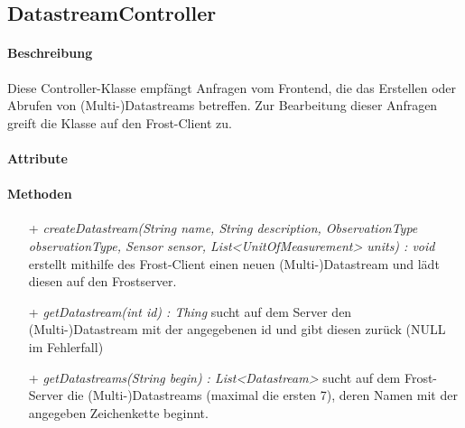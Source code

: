 \subsection{DatastreamController}

\paragraph{Beschreibung}
Diese Controller-Klasse empfängt Anfragen vom Frontend, die das Erstellen oder Abrufen von (Multi-)Datastreams betreffen. Zur Bearbeitung dieser Anfragen greift die Klasse auf den Frost-Client zu.


\paragraph{Attribute}

\paragraph{Methoden}
\begin{itemize}
\item[+] \textit{createDatastream(String name, String description, ObservationType observationType, Sensor sensor, List<UnitOfMeasurement> units) : void }
erstellt mithilfe des Frost-Client einen neuen (Multi-)Datastream und lädt diesen auf den Frostserver.
\item[+] \textit{getDatastream(int id) : Thing}
sucht auf dem Server den (Multi-)Datastream mit der angegebenen id und gibt diesen zurück (NULL im Fehlerfall)
\item[+] \textit{getDatastreams(String begin) : List<Datastream> }
sucht auf dem Frost-Server die (Multi-)Datastreams (maximal die ersten 7), deren Namen mit der angegeben Zeichenkette beginnt.
\end{itemize}